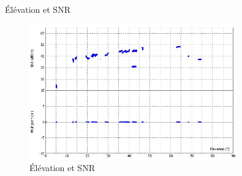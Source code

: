 \documentclass[xcolor=dvipsnames,envcountsect]{beamer}
\begin{document}
\begin{frame}{Élévation et SNR}
	\begin{figure}
		\centering
		\includegraphics[width=0.8\textwidth]{./Figures/SNR_elev.jpg}
		\caption{Élévation et SNR}
	\end{figure}
\end{frame}
\end{document}
